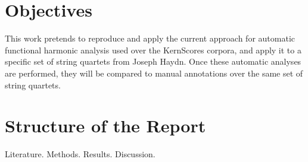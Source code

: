 \section{Objectives}
This work pretends to reproduce and apply the current approach for automatic functional harmonic analysis used over the KernScores corpora, and apply it to a specific set of string quartets from Joseph Haydn. Once these automatic analyses are performed, they will be compared to manual annotations over the same set of string quartets.

\section{Structure of the Report}
Literature. Methods. Results. Discussion.

\newpage
